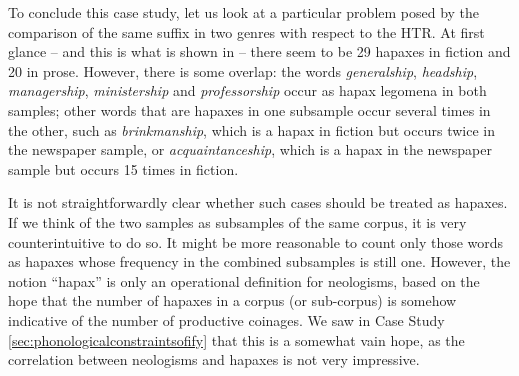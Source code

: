 To conclude this case study, let us look at a particular problem posed by the comparison of the same suffix  in two genres  with respect to the HTR.  At first glance -- and this is what is shown in  -- there seem to be 29 hapaxes  in fiction  and 20 in prose. However, there is some overlap: the words \textit{generalship}, \textit{headship}, \textit{managership}, \textit{ministership} and \textit{professorship} occur as hapax  legomena in both samples; other words that are hapaxes in one subsample occur several times in the other, such as \textit{brinkmanship}, which is a hapax in fiction but occurs twice in the newspaper sample, or \textit{acquaintanceship}, which is a hapax in the newspaper  sample but occurs 15 times in fiction.

It is not straightforwardly clear whether such cases should be treated as hapaxes.  If we think of the two samples as subsamples of the same corpus, it is very counterintuitive to do so. It might be more reasonable to count only those words as hapaxes whose frequency in the combined subsamples is still one. However, the notion ``hapax'' is only an operational  definition for neologisms,  based on the hope that the number of hapaxes in a corpus (or sub\hyp{}corpus) is somehow indicative of the number of productive  coinages. We saw in Case Study \ref{sec:phonologicalconstraintsofify} that this is a somewhat vain hope, as the correlation  between neologisms and hapaxes  is not very impressive.

